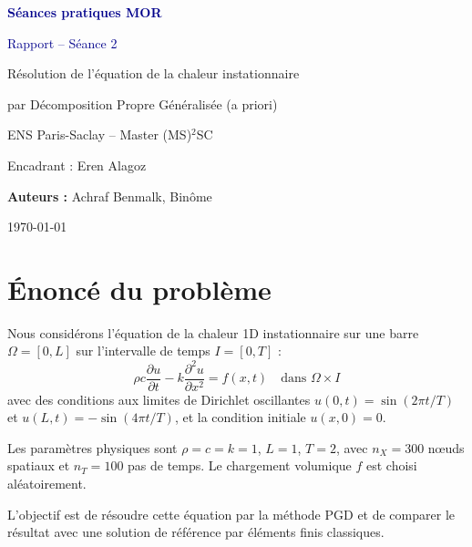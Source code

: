 \documentclass[11pt,a4paper]{article}
\begin{document}
\begin{titlepage}
\centering
\vspace*{2cm}
{\Huge\bfseries\textcolor{darkblue}{Séances pratiques MOR}\par}
\vspace{0.5cm}
{\LARGE\textcolor{darkblue}{Rapport -- Séance 2}\par}
\vspace{1.5cm}
{\Large Résolution de l'équation de la chaleur instationnaire\par}
{\large par Décomposition Propre Généralisée (a priori)\par}
\vspace{2cm}
{\large ENS Paris-Saclay -- Master (MS)$^2$SC\par}
\vspace{0.5cm}
{\large Encadrant : Eren Alagoz\par}
\vspace{2cm}
{\large \textbf{Auteurs :} Achraf Benmalk, Binôme\par}
\vspace{1cm}
{\large \today\par}
\end{titlepage}

\tableofcontents
\newpage

\section{Énoncé du problème}

Nous considérons l'équation de la chaleur 1D instationnaire sur une barre $\Omega = [0, L]$
sur l'intervalle de temps $I = [0, T]$ :
\begin{equation}
    \rho c \frac{\partial u}{\partial t} - k \frac{\partial^2 u}{\partial x^2} = f(x,t)
    \quad \text{dans } \Omega \times I
    \label{eq:heat}
\end{equation}
avec des conditions aux limites de Dirichlet oscillantes
$u(0,t) = \sin(2\pi t / T)$ et $u(L,t) = -\sin(4\pi t / T)$,
et la condition initiale $u(x,0) = 0$.

Les paramètres physiques sont $\rho = c = k = 1$, $L = 1$, $T = 2$,
avec $n_X = 300$ nœuds spatiaux et $n_T = 100$ pas de temps.
Le chargement volumique $f$ est choisi aléatoirement.

L'objectif est de résoudre cette équation par la méthode PGD et de comparer le résultat
avec une solution de référence par éléments finis classiques.
\end{document}
